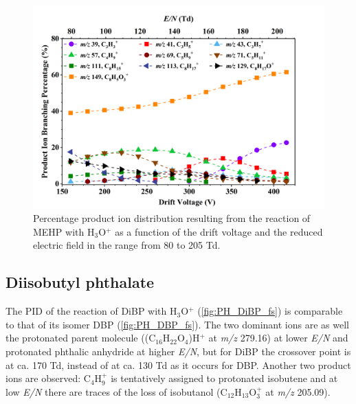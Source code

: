 \begin{figure}[htbp]
\centering
\includegraphics[height=0.4\textheight]{pics/MEHP-BR.png}
\caption{Percentage product ion distribution resulting from the reaction of MEHP with H$_3$O$^+$ as a function of the drift voltage and the reduced electric field in the range from 80 to 205 Td.}
\label{fig:PH_MEHP_fs}
\end{figure}



\subsection{Diisobutyl phthalate}

The PID of the reaction of DiBP with H$_3$O$^+$ (\autoref{fig:PH_DiBP_fs}) is comparable to that of its isomer DBP (\autoref{fig:PH_DBP_fs}).
The two dominant ions are as well the protonated parent molecule ((C$_{16}$H$_{22}$O$_4$)H$^+$ at \textit{m/z} 279.16) at lower \textit{E/N} and protonated phthalic anhydride at higher \textit{E/N}, but for DiBP the crossover point is at ca. 170 Td, instead of at ca. 130 Td as it occurs for DBP.
Another two product ions are observed:  C$_4$H$_9^+$ is tentatively assigned to protonated isobutene and 
at low \textit{E/N} there are traces of the loss of isobutanol (C$_{12}$H$_{13}$O$_3^+$ at \textit{m/z} 205.09).




